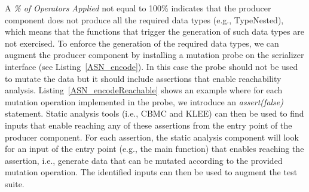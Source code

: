 A \emph{\% of Operators Applied} not equal to 100\% indicates that the producer component does not produce all the required data types (e.g., TypeNested), which means that the functions that trigger the generation of such data types are not exercised. To enforce the generation of the required data types, we can augment the producer component by installing a mutation probe on the serializer interface (see Listing~\ref{ASN_encode}). In this case the probe should not be used to mutate the data but it should include assertions that enable reachability analysis. Listing~\ref{ASN_encodeReachable} shows an example where for each mutation operation implemented in the probe, we introduce an \emph{assert(false)} statement. Static analysis tools (i.e., CBMC and KLEE)  can then be used to find inputs that enable reaching any of these assertions from the entry point of the producer component. For each assertion, the static analysis component will look for an input of the entry point (e.g., the main function) that enables reaching the assertion, i.e., generate data that can be mutated according to the provided mutation operation. The identified inputs can then be used to augment the test suite.



%
%
%
%





